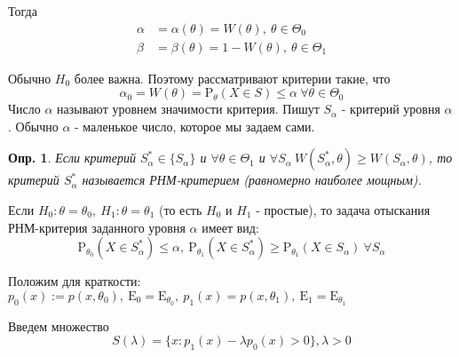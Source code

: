 \documentclass[12pt]{article}
\newtheorem{definition}{Опр.}
\theoremstyle{theorem}
\def\E{
    \mathrm{E}
}
\def\P{
    \mathrm{P}
}
\begin{document}
Тогда
\begin{align}
    \alpha &= \alpha(\theta) = W(\theta),\ \theta\in\Theta_0 \\
    \beta  &= \beta(\theta) = 1 - W(\theta),\ \theta\in\Theta_1
\end{align}

Обычно $H_0$ более важна. Поэтому рассматривают критерии
такие, что 
$$\alpha_0 = W(\theta) = \P_{\theta}(X\in S) \leq\alpha \ \forall \theta\in\Theta_0$$
Число $\alpha$ называют уровнем значимости критерия.
Пишут $S_\alpha$ - критерий уровня $\alpha$. Обычно $\alpha$ -
маленькое число, которое мы задаем сами.

\begin{definition}
    Если критерий $S^*_\alpha \in \{S_\alpha\}$ и $\forall\theta\in\Theta_1$ и
    $\forall S_\alpha \ W(S^*_\alpha,\theta) \geq W(S_\alpha, \theta)$,
    то критерий $S^*_\alpha$ называется РНМ-критерием (равномерно наиболее мощным).
\end{definition}

Если $H_0:\theta = \theta_0,\ H_1:\theta = \theta_1$ (то есть
$H_0$ и $H_1$ - простые), то задача отыскания РНМ-критерия
заданного уровня $\alpha$ имеет вид:
$$\P_{\theta_0}(X\in S^*_\alpha) \leq \alpha, \
  \P_{\theta_1}(X\in S^*_\alpha) \geq \P_{\theta_1}(X\in S_\alpha) \ \forall S_\alpha$$

Положим для краткости:
$p_0(x) := p(x, \theta_0),\ \E_0 = \E_{\theta_0},\ p_{1}(x) = p(x, \theta_1),\ \E_1 = \E_{\theta_1}$

Введем множество
$$S(\lambda) = \{x: p_1(x) - \lambda p_0(x) > 0\}, \lambda > 0$$
\end{document}
